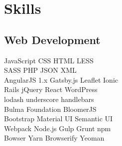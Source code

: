 \documentclass[]{deedy-resume-openfont}
\begin{document}
%
%



%
%

\begin{minipage}[t]{0.33\textwidth}


\section{Skills}
\subsection{Web Development}
JavaScript \textbullet{}   CSS \textbullet{} HTML \textbullet{} LESS \\
SASS \textbullet{} PHP \textbullet{} JSON \textbullet{} XML \\
\vspace{1pt}
AngularJS 1.x \textbullet{} Gatsby.js \textbullet{} Leaflet \textbullet{} Ionic\\
Rails \textbullet{} jQuery \textbullet{} React \textbullet{} WordPress \\
lodash \textbullet{} underscore \textbullet{} handlebars \\
\vspace{1pt}
Bulma \textbullet{} Foundation \textbullet{} BloomerJS \\
Bootstrap \textbullet{} Material UI \textbullet{} Semantic UI \\
\vspace{1pt}
Webpack \textbullet{} Node.js \textbullet{} Gulp \textbullet{} Grunt \textbullet{} npm \\ Bowser \textbullet{} Yarn \textbullet{} Browserify  \textbullet{} Yeoman \\
\vspace{5pt}

\end{minipage}
\end{document}
